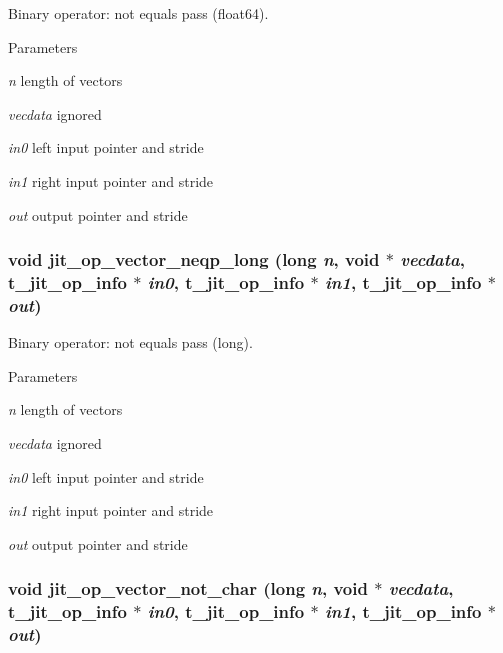 Binary operator: not equals pass (float64). 
\begin{DoxyParams}{Parameters}
\item[{\em n}]length of vectors \item[{\em vecdata}]ignored \item[{\em in0}]left input pointer and stride \item[{\em in1}]right input pointer and stride \item[{\em out}]output pointer and stride \end{DoxyParams}
\hypertarget{group__opvecmod_gac04014050c3a66b79f388e205c2b3d76}{
\subsubsection[{jit\_\-op\_\-vector\_\-neqp\_\-long}]{\setlength{\rightskip}{0pt plus 5cm}void jit\_\-op\_\-vector\_\-neqp\_\-long (long {\em n}, \/  void $\ast$ {\em vecdata}, \/  {\bf t\_\-jit\_\-op\_\-info} $\ast$ {\em in0}, \/  {\bf t\_\-jit\_\-op\_\-info} $\ast$ {\em in1}, \/  {\bf t\_\-jit\_\-op\_\-info} $\ast$ {\em out})}}
\label{group__opvecmod_gac04014050c3a66b79f388e205c2b3d76}


Binary operator: not equals pass (long). 
\begin{DoxyParams}{Parameters}
\item[{\em n}]length of vectors \item[{\em vecdata}]ignored \item[{\em in0}]left input pointer and stride \item[{\em in1}]right input pointer and stride \item[{\em out}]output pointer and stride \end{DoxyParams}
\hypertarget{group__opvecmod_ga6121a753bfd1d3d16663ea3a0a635cbd}{
\subsubsection[{jit\_\-op\_\-vector\_\-not\_\-char}]{\setlength{\rightskip}{0pt plus 5cm}void jit\_\-op\_\-vector\_\-not\_\-char (long {\em n}, \/  void $\ast$ {\em vecdata}, \/  {\bf t\_\-jit\_\-op\_\-info} $\ast$ {\em in0}, \/  {\bf t\_\-jit\_\-op\_\-info} $\ast$ {\em in1}, \/  {\bf t\_\-jit\_\-op\_\-info} $\ast$ {\em out})}}
\label{group__opvecmod_ga6121a753bfd1d3d16663ea3a0a635cbd}


